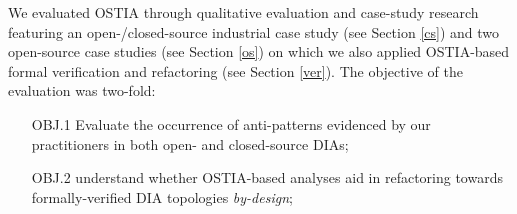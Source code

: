 \documentclass[smallextended]{svjour3}       %
\begin{document}

We evaluated OSTIA through qualitative evaluation and case-study research featuring an open-/closed-source industrial case study (see Section \ref{cs}) and two open-source case studies (see Section \ref{os}) on which we also applied OSTIA-based formal verification and refactoring (see Section \ref{ver}). The objective of the evaluation was two-fold:
\begin{enumerate}
\item[OBJ.1] Evaluate the occurrence of anti-patterns evidenced by our practitioners in both open- and closed-source DIAs;
\item[OBJ.2] understand whether OSTIA-based analyses aid in refactoring towards formally-verified DIA topologies \emph{by-design};
\end{enumerate}
\end{document}
